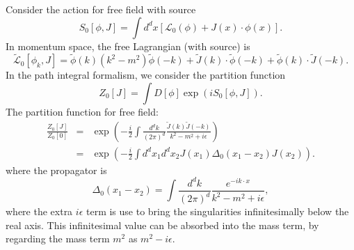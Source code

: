 Consider the action for free field with source
\begin{equation*}
	S_0[\phi,J]
	= \int d^dx\left[\mathcal{L}_0(\phi) + J(x)\cdot\phi(x) \right].
\end{equation*}
In momentum space, the free Lagrangian (with source) is 
\begin{equation*}
	\tilde{\mathcal L}_0[\phi_k,J]=\tilde\phi(k)( k^2-m^2)\tilde\phi(-k)+\tilde J(k)\cdot\tilde\phi(-k)+\tilde\phi(k)\cdot\tilde J(-k).
\end{equation*}
In the path integral formalism, we consider the partition function 
\begin{equation}
	Z_0[J] = \int D[\phi] \exp(iS_0[\phi,J]).
\end{equation}
The partition function for free field:
\begin{eqnarray*}
	\frac{Z_0[J]}{Z_0[0]}
	&=& \exp\left(-\frac{i}{2}\int \frac{d^dk}{(2\pi)^d} \frac{\tilde J(k) \tilde J(-k)}{k^2-m^2+i\epsilon} \right) \\
	&=& \exp\left(-\frac{i}{2}\int d^dx_1 d^dx_2 J(x_1)\Delta_0(x_1-x_2)J(x_2)\right).
\end{eqnarray*}
where the propagator is
\begin{equation}
	\Delta_0(x_1-x_2) = \int \frac{d^dk}{(2\pi)^d} \frac{e^{-ik\cdot x}}{k^2-m^2+i\epsilon},
\end{equation}
where the extra $i\epsilon$ term is use to bring the singularities infinitesimally below the real axis. 
This infinitesimal value can be absorbed into the mass term, by regarding the mass term $m^2$ as $m^2-i\epsilon$.

